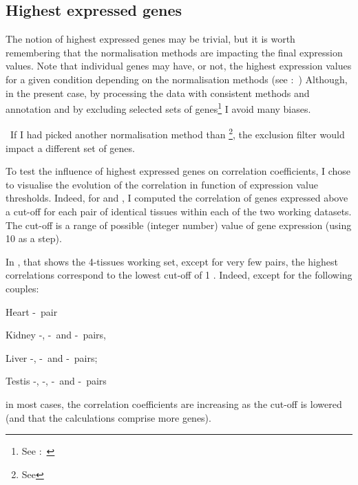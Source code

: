\subsection{Highest expressed genes}

The notion of highest expressed genes may be trivial,
but it is worth remembering that the normalisation methods are impacting
the final expression values.
Note that individual genes may have, or not,
the highest expression values for a given condition
depending on the normalisation methods
(see :~)
Although, in the present case,
by processing the data with consistent methods and annotation
and by excluding selected sets of
genes\footnote{See :~}
I avoid many biases.

\NB\ If I had picked another normalisation method than \FPKM\footnote{See
},
the exclusion filter would impact a different set of genes.

To test the influence of highest expressed genes on correlation coefficients,
I chose to visualise the evolution of the correlation
in function of expression value thresholds.
Indeed, for  and ,
I computed the correlation of genes expressed above a cut-off
for each pair of identical tissues within each of the two working datasets.
The cut-off is a range of possible (integer number) value of gene expression
(using 10 as a step).

In , that shows the 4-tissues working set,
except for very few pairs, the highest correlations correspond to
the lowest cut-off of 1 \FPKM\@.
Indeed, except for the following couples:
\begin{eqlist}
\item[Heart] \uhlen{}-\gtex\ pair
\item[Kidney] \uhlen{}-\gtex, \castle{}-\uhlen\ and \castle{}-\gtex\ pairs,
\item[Liver]  \vt{}-\ibm, \ibm{}-\uhlen\ and \ibm{}-\uhlen\ pairs;
\item[Testis] \ibm{}-\uhlen, \vt{}-\gtex, \vt{}-\uhlen\ and \uhlen{}-\gtex\ pairs
\end{eqlist}
in most cases,
the correlation coefficients are increasing as the cut-off is lowered
(and that the calculations comprise more genes).

